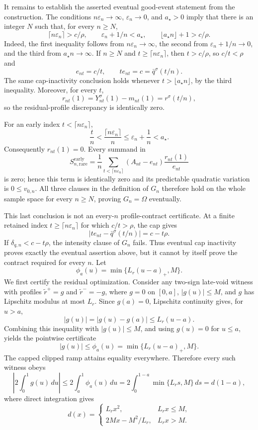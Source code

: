 It remains to establish the asserted eventual good-event statement from the construction. The conditions \(n\varepsilon_n\to\infty\), \(\varepsilon_n\to0\), and \(a_\star>0\) imply that there is an integer \(N\) such that, for every \(n\ge N\),
\[
 \lceil n\varepsilon_n\rceil>c/\rho,
 \qquad
 \varepsilon_n+1/n<a_\star,
 \qquad
 \lfloor a_\star n\rfloor+1>c/\rho.
\]
Indeed, the first inequality follows from \(n\varepsilon_n\to\infty\), the second from \(\varepsilon_n+1/n\to0\), and the third from \(a_\star n\to\infty\). If \(n\ge N\) and \(t\ge\lceil n\varepsilon_n\rceil\), then \(t>c/\rho\), so \(c/t<\rho\) and
\[
 e_{nt}=c/t,
 \qquad
 t e_{nt}=c=\bar q^\sigma(t/n).
\]
The same cap-inactivity conclusion holds whenever \(t>\lfloor a_\star n\rfloor\), by the third inequality. Moreover, for every \(t\),
\[
 r_{nt}(1)=Y_{nt}^\sigma(1)-m_{nt}(1)
 =r^\sigma(t/n),
\]
so the residual-profile discrepancy is identically zero.

For an early index \(t<\lceil n\varepsilon_n\rceil\),
\[
 \frac tn<\frac{\lceil n\varepsilon_n\rceil}{n}
 \le\varepsilon_n+\frac1n<a_\star.
\]
Consequently \(r_{nt}(1)=0\). Every summand in
\[
 S_{n,\mathrm{rare}}^{\mathrm{early}}
 =\frac1n\sum_{t<\lceil n\varepsilon_n\rceil}
 (A_{nt}-e_{nt})\frac{r_{nt}(1)}{e_{nt}}
\]
is zero; hence this term is identically zero and its predictable quadratic variation is \(0\le v_{0,n}\). All three clauses in the definition of \(G_n\) therefore hold on the whole sample space for every \(n\ge N\), proving \(G_n=\Omega\) eventually.

This last conclusion is not an every-\(n\) profile-contract certificate. At a finite retained index \(t\ge\lceil n\varepsilon_n\rceil\) for which \(c/t>\rho\), the cap gives
\[
 |t e_{nt}-\bar q^\sigma(t/n)|=c-t\rho.
\]
If \(\delta_{q,n}<c-t\rho\), the intensity clause of \(G_n\) fails. Thus eventual cap inactivity proves exactly the eventual assertion above, but it cannot by itself prove the contract required for every \(n\).
Let
\[
 \phi_a(u)=\min\{L_r(u-a)_+,M\}.
\]
We first certify the residual optimization. Consider any two-sign late-void witness with profiles \(\widetilde r^+=g\) and \(\widetilde r^-=-g\), where \(g=0\) on \([0,a]\), \(|g(u)|\le M\), and \(g\) has Lipschitz modulus at most \(L_r\). Since \(g(a)=0\), Lipschitz continuity gives, for \(u>a\),
\[
 |g(u)|=|g(u)-g(a)|\le L_r(u-a).
\]
Combining this inequality with \(|g(u)|\le M\), and using \(g(u)=0\) for \(u\le a\), yields the pointwise certificate
\[
 |g(u)|\le\phi_a(u)=\min\{L_r(u-a)_+,M\}.
\]
The capped clipped ramp attains equality everywhere. Therefore every such witness obeys
\[
 \left|2\int_0^1 g(u)\,du\right|
 \le 2\int_a^1\phi_a(u)\,du
 =2\int_0^{1-a}\min\{L_rs,M\}\,ds
 =d(1-a),
\]
where direct integration gives
\[
 d(x)=
 \begin{cases}
 L_rx^2,&L_rx\le M,\\
 2Mx-M^2/L_r,&L_rx>M.
 \end{cases}
\]

